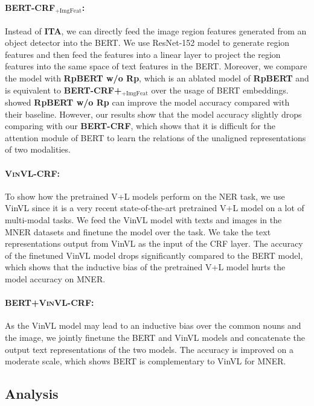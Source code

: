 \documentclass[11pt]{article}
\begin{document}
\paragraph{{\textbf{BERT-CRF$_{\text{+ImgFeat}}$}}:} Instead of \textbf{ITA}, we can directly feed the image region features generated from an object detector into the BERT. We use ResNet-152 model to generate region features and then feed the features into a linear layer to project the region features into the same space of text features in the BERT. Moreover, we compare the model with {\textbf{RpBERT w/o Rp}}, which is an ablated model of {\textbf{RpBERT}} and is equivalent to {\textbf{BERT-CRF+$_{\text{+ImgFeat}}$}} over the usage of BERT embeddings. \citet{Sun2021RpBERTAT} showed {\textbf{RpBERT w/o Rp}} can improve the model accuracy compared with their baseline. However, our results show that the model accuracy slightly drops comparing with our {\textbf{BERT-CRF}}, which shows that it is difficult for the attention module of BERT to learn the relations of the unaligned representations of two modalities. 
\paragraph{\textsc{\bf VinVL-CRF}:} To show how the pretrained V+L models perform on the NER task, we use VinVL since it is a very recent state-of-the-art pretrained V+L model on a lot of multi-modal tasks. We feed the VinVL model with texts and images in the MNER datasets and finetune the model over the task. We take the text representations output from VinVL as the input of the CRF layer. The accuracy of the finetuned VinVL model drops significantly compared to the BERT model, which shows that the inductive bias of the pretrained V+L model hurts the model accuracy on MNER.
\paragraph{\textsc{\bf BERT+VinVL-CRF}:} As the VinVL model may lead to an inductive bias over the common nouns and the image, we jointly finetune the BERT and VinVL models and concatenate the output text representations of the two models. The accuracy is improved on a moderate scale, which shows BERT is complementary to VinVL for MNER.




\subsection{Analysis}
\end{document}
